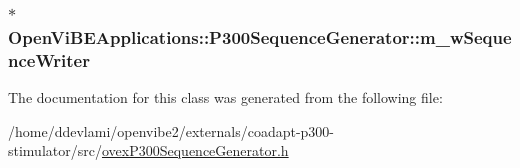 \label{classOpenViBEApplications_1_1P300SequenceGenerator_a221d4dda210b33fe4f447313187c833a}
\hypertarget{classOpenViBEApplications_1_1P300SequenceGenerator_a24647523b5cad20e5f8d4ae40251373a}{
\subsubsection[{m\_\-wSequenceWriter}]{$\ast$ {\bf OpenViBEApplications::P300SequenceGenerator::m\_\-wSequenceWriter}}}
\label{classOpenViBEApplications_1_1P300SequenceGenerator_a24647523b5cad20e5f8d4ae40251373a}


The documentation for this class was generated from the following file:\begin{DoxyCompactItemize}
\item 
/home/ddevlami/openvibe2/externals/coadapt-\/p300-\/stimulator/src/\hyperlink{ovexP300SequenceGenerator_8h}{ovexP300SequenceGenerator.h}\end{DoxyCompactItemize}
